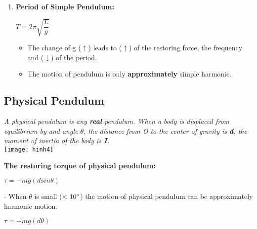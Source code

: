\documentclass[10pt]{article}
\begin{document}
\begin{enumerate}
	\item \textbf{Period of Simple Pendulum: } \\
	\begin{mybox}
		\begin{center}
			$T = 2 \pi \sqrt{\dfrac{L}{g}}$
		\end{center}
	\end{mybox}

	\begin{itemize}
		\item The change of g ($\uparrow$) leads to ($\uparrow$) of the restoring force, the frequency and ($\downarrow$) of the period.
		\item The motion of pendulum is only \textbf{approximately} simple harmonic.
	\end{itemize}
\end{enumerate}

\subsection{Physical Pendulum}
\textit{A physical pendulum is any \textbf{real} pendulum. When a body is displaced from equilibrium by and angle $\theta$, the distance from O to the center of gravity is \textbf{d}, the moment of inertia of the body is \textbf{I}.} \\

\texttt{[image: hinh4]}
\bigbreak

\textbf{The restoring torque of physical pendulum: } \\
\begin{mybox}
	\begin{center}
		$\tau  = -mg (d sin \theta)$
	\end{center}
\end{mybox}

- When $\theta$ is small ($< 10 \degree$) the motion of physical pendulum can be approximately harmonic motion. \\
\begin{mybox}
	\begin{center}
		  $\tau  = -mg (d \theta)$
	\end{center}
\end{mybox}
\end{document}
